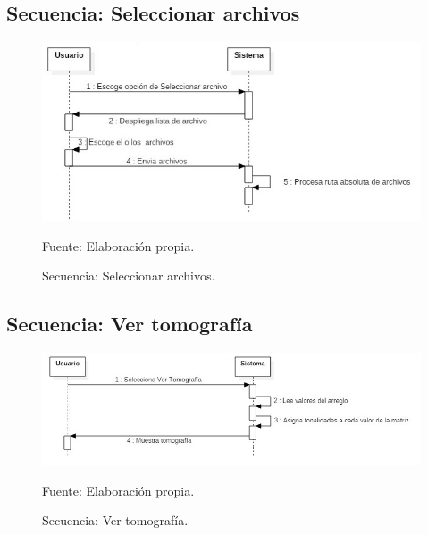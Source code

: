 \documentclass[12pt]{report}
\begin{document}
\subsection{Secuencia: Seleccionar archivos}
\begin{figure}[H]
\centering
\includegraphics[width = 12 cm, height = 7 cm]{seleccionar_archivo}
\caption{Secuencia: Seleccionar archivos.}
Fuente: Elaboración propia.
\end{figure}

\subsection{Secuencia: Ver tomografía}
\begin{figure}[H]
\centering
\includegraphics[width = 12 cm, height = 7 cm]{visualizar}
\caption{Secuencia: Ver tomografía.}
Fuente: Elaboración propia.
\end{figure}
\end{document}
